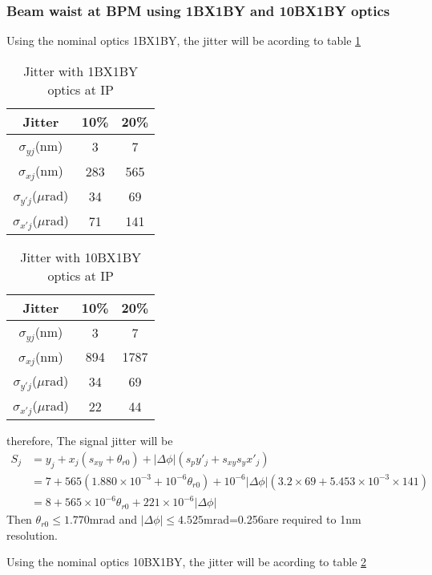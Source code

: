 \subsubsection{Beam waist at BPM using 1BX1BY and 10BX1BY optics}
Using the nominal optics 1BX1BY, the jitter will be acording to table \ref{t-jitter1BX1BY}
\begin{table}[hbt]
\begin{center}
 \begin{tabular}{|c|c|c|}\hline
 Jitter &10\% & 20\%\\\hline
 $\sigma_{yj}$(nm) & 3  & 7\\\hline
 $\sigma_{xj}$(nm) &283&565 \\\hline
 $\sigma_{y'j}$($\mu$rad) &34&69\\\hline
 $\sigma_{x'j}$($\mu$rad) &71&141\\\hline
 \end{tabular}
 \caption{Jitter with 1BX1BY optics at IP}\label{t-jitter1BX1BY}
 \end{center}
\end{table}
\begin{table}[hbt]
\begin{center}
 \begin{tabular}{|c|c|c|}\hline
 Jitter &10\% & 20\%\\\hline
 $\sigma_{yj}$(nm) & 3  & 7\\\hline
 $\sigma_{xj}$(nm) &894&1787 \\\hline
 $\sigma_{y'j}$($\mu$rad) &34&69\\\hline
 $\sigma_{x'j}$($\mu$rad) &22&44\\\hline
 \end{tabular}
 \caption{Jitter with 10BX1BY optics at IP}\label{t-jitter10BX1BY}
 \end{center}
\end{table}
therefore, The signal jitter will be
\begin{align*}
 S_j&=y_j+x_j(s_{xy}+\theta_{r0})+|\Delta\phi|(s_py'_j+s_{xy}s_yx'_j)\\
 &=7+565(1.880\times10^{-3}+10^{-6}\theta_{r0})+10^{-6}|\Delta\phi|(3.2\times69+5.453\times10^{-3}\times141)\\
 &=8+565\times10^{-6}\theta_{r0}+221\times10^{-6}|\Delta\phi|
\end{align*}
Then $\theta_{r0}\leq 1.770$mrad and $|\Delta\phi|\leq 4.525$mrad=0.256\degre are required to 1nm resolution.\par
Using the nominal optics 10BX1BY, the jitter will be acording to table \ref{t-jitter10BX1BY}
